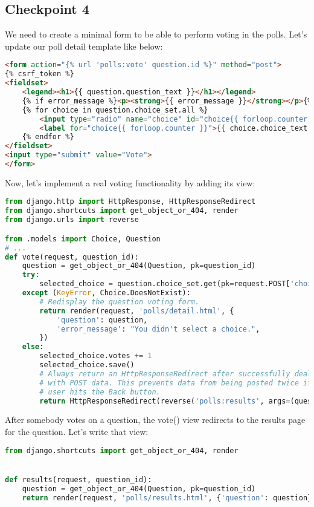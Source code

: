 \documentclass{homework}
\begin{document}
\subsection*{Checkpoint 4}
We need to create a minimal form to be able to perform voting in the polls. Let's update our poll detail template like below:
\begin{lstlisting}[language=HTML]
<form action="{% url 'polls:vote' question.id %}" method="post">
{% csrf_token %}
<fieldset>
    <legend><h1>{{ question.question_text }}</h1></legend>
    {% if error_message %}<p><strong>{{ error_message }}</strong></p>{% endif %}
    {% for choice in question.choice_set.all %}
        <input type="radio" name="choice" id="choice{{ forloop.counter }}" value="{{ choice.id }}">
        <label for="choice{{ forloop.counter }}">{{ choice.choice_text }}</label><br>
    {% endfor %}
</fieldset>
<input type="submit" value="Vote">
</form>
\end{lstlisting}
Now, let's implement a real voting functionality by adding its view:
\begin{lstlisting}[language=Python]
from django.http import HttpResponse, HttpResponseRedirect
from django.shortcuts import get_object_or_404, render
from django.urls import reverse

from .models import Choice, Question
# ...
def vote(request, question_id):
    question = get_object_or_404(Question, pk=question_id)
    try:
        selected_choice = question.choice_set.get(pk=request.POST['choice'])
    except (KeyError, Choice.DoesNotExist):
        # Redisplay the question voting form.
        return render(request, 'polls/detail.html', {
            'question': question,
            'error_message': "You didn't select a choice.",
        })
    else:
        selected_choice.votes += 1
        selected_choice.save()
        # Always return an HttpResponseRedirect after successfully dealing
        # with POST data. This prevents data from being posted twice if a
        # user hits the Back button.
        return HttpResponseRedirect(reverse('polls:results', args=(question.id,)))
\end{lstlisting}
After somebody votes on a question, the vote() view redirects to the results page for the question. Let’s write that view:
\begin{lstlisting}[language=Python]
from django.shortcuts import get_object_or_404, render


def results(request, question_id):
    question = get_object_or_404(Question, pk=question_id)
    return render(request, 'polls/results.html', {'question': question})
\end{lstlisting}
\end{document}
